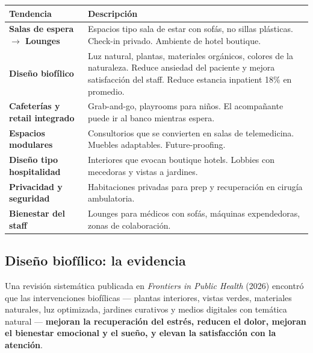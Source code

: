 \documentclass[11pt, a4paper]{article}
\newcommand{\fuente}[1]{\par\vspace{2pt}{\scriptsize\textcolor{slate}{Fuente: #1}}}
\begin{document}
\begin{center}
\begin{tabular}{@{}p{4cm}p{9cm}@{}}
\toprule
\textbf{Tendencia} & \textbf{Descripci\'{o}n} \\
\midrule
\textbf{Salas de espera $\rightarrow$ Lounges} & Espacios tipo sala de estar con sof\'{a}s, no sillas pl\'{a}sticas. Check-in privado. Ambiente de hotel boutique. \\[4pt]
\textbf{Dise\~{n}o biof\'{i}lico} & Luz natural, plantas, materiales org\'{a}nicos, colores de la naturaleza. Reduce ansiedad del paciente y mejora satisfacci\'{o}n del staff. Reduce estancia inpatient 18\% en promedio. \\[4pt]
\textbf{Cafeter\'{i}as y retail integrado} & Grab-and-go, playrooms para ni\~{n}os. El acompa\~{n}ante puede ir al banco mientras espera. \\[4pt]
\textbf{Espacios modulares} & Consultorios que se convierten en salas de telemedicina. Muebles adaptables. Future-proofing. \\[4pt]
\textbf{Dise\~{n}o tipo hospitalidad} & Interiores que evocan boutique hotels. Lobbies con mecedoras y vistas a jardines. \\[4pt]
\textbf{Privacidad y seguridad} & Habitaciones privadas para prep y recuperaci\'{o}n en cirug\'{i}a ambulatoria. \\[4pt]
\textbf{Bienestar del staff} & Lounges para m\'{e}dicos con sof\'{a}s, m\'{a}quinas expendedoras, zonas de colaboraci\'{o}n. \\
\bottomrule
\end{tabular}
\end{center}

\fuente{HCD Magazine, KI Healthcare Insights 2026, ASC News, IIDA, Healthcare Facilities Today}

\subsection{Dise\~{n}o biof\'{i}lico: la evidencia}

Una revisi\'{o}n sistem\'{a}tica publicada en \textit{Frontiers in Public Health} (2026) encontr\'{o} que las intervenciones biof\'{i}licas — plantas interiores, vistas verdes, materiales naturales, luz optimizada, jardines curativos y medios digitales con tem\'{a}tica natural — \textbf{mejoran la recuperaci\'{o}n del estr\'{e}s, reducen el dolor, mejoran el bienestar emocional y el sue\~{n}o, y elevan la satisfacci\'{o}n con la atenci\'{o}n}.
\end{document}
